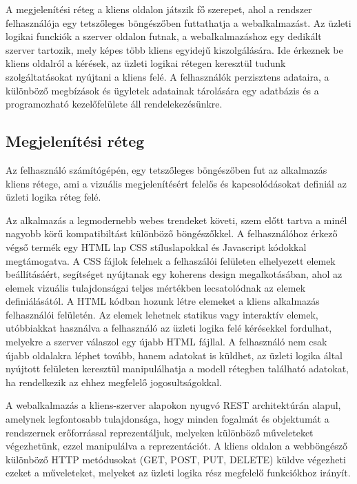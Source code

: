  A megjelenítési réteg a kliens oldalon játszik fő szerepet, ahol a rendszer felhasználója egy tetszőleges böngészőben futtathatja a webalkalmazást. Az üzleti logikai funckiók a szerver oldalon futnak, a webalkalmazáshoz egy dedikált szerver tartozik, mely képes több kliens egyidejű kiszolgálására. Ide érkeznek be kliens oldalról a kérések, az üzleti logikai rétegen keresztül tudunk szolgáltatásokat nyújtani a kliens felé. A felhasználók perzisztens adataira, a különböző megbízások és ügyletek adatainak tárolására egy adatbázis és a programozható kezelőfelülete áll rendelekezésünkre.

\subsection{Megjelenítési réteg}\label{sect:kliens_reteg}

Az felhasználó számítógépén, egy tetszőleges böngészőben fut az alkalmazás kliens rétege, ami a vizuális megjelenítésért felelős és kapcsolódásokat definiál az üzleti logika réteg felé.

Az alkalmazás a legmodernebb webes trendeket követi, szem előtt tartva a minél nagyobb körű kompatibiltást különböző böngészőkkel. A felhasználóhoz érkező végső termék egy HTML lap CSS stíluslapokkal és Javascript kódokkal megtámogatva. 
A CSS fájlok felelnek a felhaszálói felületen elhelyezett elemek beállításáért, segítséget nyújtanak egy koherens design megalkotásában, ahol az elemek vizuális tulajdonságai teljes mértékben lecsatolódnak az elemek definiálásától.
A HTML kódban hozunk létre elemeket a kliens alkalmazás felhasználói felületén. Az elemek lehetnek statikus vagy interaktív elemek, utóbbiakkat használva a felhasználó az üzleti logika felé kérésekkel fordulhat, melyekre a szerver válaszol egy újabb HTML fájllal. A felhasználó nem csak újabb oldalakra léphet tovább, hanem adatokat is küldhet, az üzleti logika által nyújtott felületen keresztül manipulálhatja a modell rétegben található adatokat, ha rendelkezik az ehhez megfelelő jogosultságokkal.

\bigskip

A webalkalmazás a kliens-szerver alapokon nyugvó REST architektúrán alapul, amelynek legfontosabb tulajdonsága, hogy minden fogalmát és objektumát a rendszernek erőforrással reprezentáljuk, melyeken különböző műveleteket végezhetünk, ezzel manipulálva a reprezentációt. A kliens oldalon a webböngésző különböző HTTP metódusokat (GET, POST, PUT, DELETE) küldve végezheti ezeket a műveleteket, melyeket az üzleti logika rész megfelelő funkciókhoz irányít.

